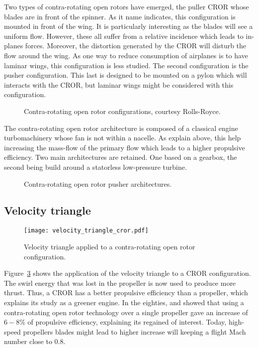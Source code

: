 Two types of contra-rotating open rotors have emerged, the
puller CROR whose blades are in front of the spinner. As it
name indicates, this configuration is mounted in front of the
wing. It is particularly interesting as the blades will see
a uniform flow. However, these all suffer from a relative incidence
which leads to in-planes forces. Moreover, the distortion generated
by the CROR will disturb the flow around the wing. As one way to reduce
consumption of airplanes is to have laminar wings, this configuration
is less studied. The second configuration is the pusher
configuration. This last is designed to be mounted on a pylon which
will interacts with the CROR, but laminar wings might be considered with
this configuration.
\begin{figure}[htb]
  \centering
  \caption{Contra-rotating open rotor configurations, courtesy Rolls-Royce.}
  \label{fig:cror_architectures}
\end{figure}

The contra-rotating open rotor architecture is composed of a classical engine
turbomachinery whose fan is not within a nacelle. As explain
above, this help increasing the mass-flow of the primary flow
which leads to a higher propulsive efficiency.
Two main architectures are retained. One based on a gearbox, the second
being build around a statorless low-pressure turbine.
\begin{figure}[htb]
  \centering
  \caption{Contra-rotating open rotor pusher architectures.}
  \label{fig:cror_architectures}
\end{figure}

\subsection{Velocity triangle}
\label{sub:cror_velocity_triangle}
\begin{figure}[htbp]
  \centering
  \texttt{[image: velocity\_triangle\_cror.pdf]}
  \caption{Velocity triangle applied to a contra-rotating open rotor configuration.}
  \label{fig:velocity_triangle_cror}
\end{figure}
Figure~\ref{fig:velocity_triangle_cror} shows the application
of the velocity triangle to a CROR configuration. The swirl
energy that was lost in the propeller is now used to 
produce more thrust. Thus, a CROR has a better propulsive
efficiency than a propeller, which explains its study as
a greener engine. In the eighties, 
\citet{Strack1981} and \citet{Hager1988} showed that
using a contra-rotating open rotor technology over
a single propeller gave an increase of $6-8\%$
of propulsive efficiency, explaining its regained of interest.
Today, high-speed propellers blades might lead to higher increase
will keeping a flight Mach number close to $0.8$.

